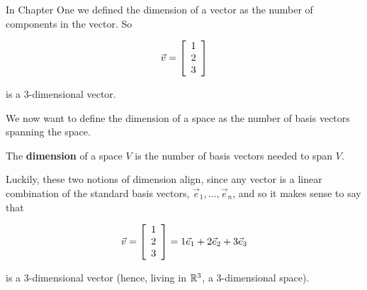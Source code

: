 \documentclass{ximera}
\begin{document}

    






\begin{remark}

  In Chapter One we defined the dimension of a vector as the number of components in the vector. So 

  $$\vec{v}=\startmat{r} 1 \\ 2 \\ 3 \stopmat$$

  is a 3-dimensional vector.

  We now want to define the dimension of a space as the number of basis vectors spanning the space.

  \begin{definition}
  
    The \textbf{dimension} of a space $V$ is the number of basis vectors needed to span $V$.

  \end{definition}

  Luckily, these two notions of dimension align, since any vector is a linear combination of the standard basis vectors, $\vec{e}_1,\ldots,\vec{e}_n$, and so it makes sense to say that 

  $$\vec{v}=\startmat{r} 1 \\ 2 \\ 3 \stopmat=1\vec{e}_1+2\vec{e}_2+3\vec{e}_3$$

  is a 3-dimensional vector (hence, living in $\R^3$, a 3-dimensional space).

\end{remark}
\end{document}
